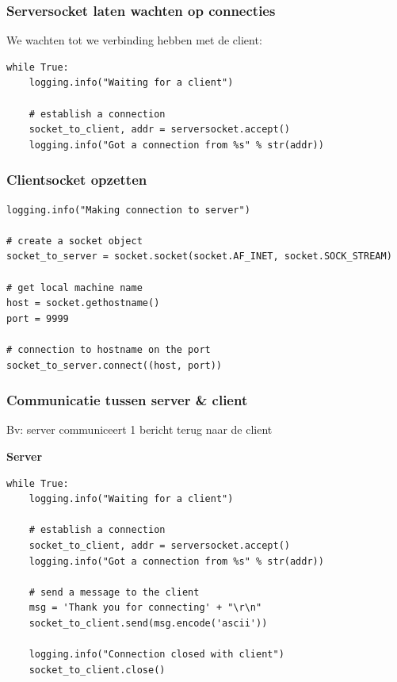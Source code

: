 \documentclass{article}
\begin{document}
\subsubsection{Serversocket laten wachten op connecties}

We wachten tot we verbinding hebben met de client:

\begin{verbatim}
while True:
    logging.info("Waiting for a client")
    
    # establish a connection
    socket_to_client, addr = serversocket.accept()
    logging.info("Got a connection from %s" % str(addr))
\end{verbatim}

\subsubsection{Clientsocket opzetten}

\begin{verbatim}
logging.info("Making connection to server")

# create a socket object
socket_to_server = socket.socket(socket.AF_INET, socket.SOCK_STREAM)

# get local machine name
host = socket.gethostname()
port = 9999

# connection to hostname on the port
socket_to_server.connect((host, port))
\end{verbatim}

\subsubsection{Communicatie tussen server \& client}

Bv: server communiceert 1 bericht terug naar de client

\textbf{Server}

\begin{verbatim}
while True:
    logging.info("Waiting for a client")

    # establish a connection 
    socket_to_client, addr = serversocket.accept()
    logging.info("Got a connection from %s" % str(addr))
    
    # send a message to the client
    msg = 'Thank you for connecting' + "\r\n"
    socket_to_client.send(msg.encode('ascii'))

    logging.info("Connection closed with client")
    socket_to_client.close()
\end{verbatim}
\end{document}
